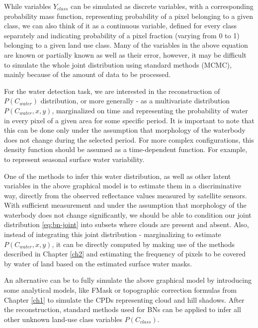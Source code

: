 While variables $Y_{class}$ can be simulated as discrete variables, with a corresponding probability mass function, representing probability of a pixel belonging to a given class, we can also think of it as a continuous variable, defined for every class separately and indicating probability of a pixel fraction (varying from 0 to 1) belonging to a given land use class. Many of the variables in the above equation are known or partially known as well as their error, however, it may be difficult to simulate the whole joint distribution using standard methods (MCMC), mainly because of the amount of data to be processed.

For the water detection task, we are interested in the reconstruction of $P(C_{water})$ distribution, or more generally - as a multivariate distribution $P(C_{water}, x, y)$, marginalized on time and representing the probability of water in every pixel of a given area for some specific period. It is important to note that this can be done only under the assumption that morphology of the waterbody does not change during the selected period. For more complex configurations, this density function should be assumed as a time-dependent function. For example, to represent seasonal surface water variability. 

One of the methods to infer this water distribution, as well as other latent variables in the above graphical model is to estimate them in a discriminative way, directly from the observed reflectance values measured by satellite sensors. With sufficient measurement and under the assumption that morphology of the waterbody does not change significantly, we should be able to condition our joint distribution \ref{eq:bn-joint} into subsets where clouds are present and absent. Also, instead of integrating this joint distribution - marginalizing to estimate $P(C_{water}, x, y)$, it can be directly computed by making use of the methods described in Chapter \ref{ch2} and estimating the frequency of pixels to be covered by water of land based on the estimated surface water masks.

An alternative can be to fully simulate the above graphical model by introducing some analytical models, like FMask or topographic correction formulas from Chapter \ref{ch1} to simulate the CPDs representing cloud and hill shadows. After the reconstruction, standard methods used for BNs can be applied to infer all other unknown land-use class variables $P(C_{class})$.


